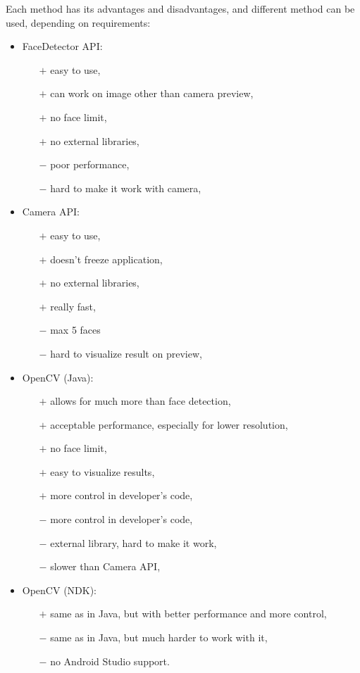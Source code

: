 Each method has its advantages and disadvantages, and different method can be
used, depending on requirements:
\begin{itemize}
  \item FaceDetector API:
  	\begin{itemize}
  	  \item[$+$] easy to use,
  	  \item[$+$] can work on image other than camera preview,
  	  \item[$+$] no face limit,
  	  \item[$+$] no external libraries,
  	  \item[$-$] poor performance,
  	  \item[$-$] hard to make it work with camera,
  	\end{itemize}
  \item Camera API:
	\begin{itemize}
  	  \item[$+$] easy to use,
  	  \item[$+$] doesn't freeze application,
  	  \item[$+$] no external libraries,
  	  \item[$+$] really fast,
  	  \item[$-$] max 5 faces
  	  \item[$-$] hard to visualize result on preview,
  	\end{itemize}
  \item OpenCV (Java):
	\begin{itemize}
  	  \item[$+$] allows for much more than face detection,
  	  \item[$+$] acceptable performance, especially for lower resolution,
  	  \item[$+$] no face limit,
  	  \item[$+$] easy to visualize results,
  	  \item[$+$] more control in developer's code,
  	  \item[$-$] more control in developer's code,
  	  \item[$-$] external library, hard to make it work,
  	  \item[$-$] slower than Camera API,
  	\end{itemize}
  \item OpenCV (NDK):
	\begin{itemize}
  	  \item[$+$] same as in Java, but with better performance and more control,
  	  \item[$-$] same as in Java, but much harder to work with it,
  	  \item[$-$] no Android Studio support.
  	\end{itemize}
\end{itemize}


